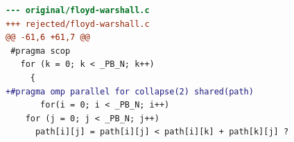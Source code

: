 \begin{lstlisting}[language=diff,basicstyle=\ttfamily\scriptsize,breaklines=true,caption={polybench/floyd-warshall — attempt 1 of 2, rejected by the gate at 'tsan': Race detected: / WARNING: ThreadSanitizer: data race (pid=1613218)}]
--- original/floyd-warshall.c
+++ rejected/floyd-warshall.c
@@ -61,6 +61,7 @@
 #pragma scop
   for (k = 0; k < _PB_N; k++)
     {
+#pragma omp parallel for collapse(2) shared(path)
       for(i = 0; i < _PB_N; i++)
 	for (j = 0; j < _PB_N; j++)
 	  path[i][j] = path[i][j] < path[i][k] + path[k][j] ?
\end{lstlisting}
